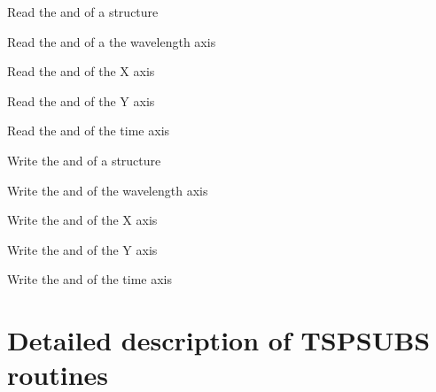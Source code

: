 \begin{mansectionroutines}
     Read the {} and {} of a structure

     Read the {} and {} of a the wavelength axis

     Read the {} and {} of the X axis

     Read the {} and {} of the Y axis

     Read the {} and {} of the time axis

     Write the {} and {} of a structure

     Write the {} and {} of the wavelength axis

     Write the {} and {} of the X axis

     Write the {} and {} of the Y axis

     Write the {} and {} of the time axis

\end{mansectionroutines}


\newpage
                          
\section{Detailed description of TSPSUBS routines}

